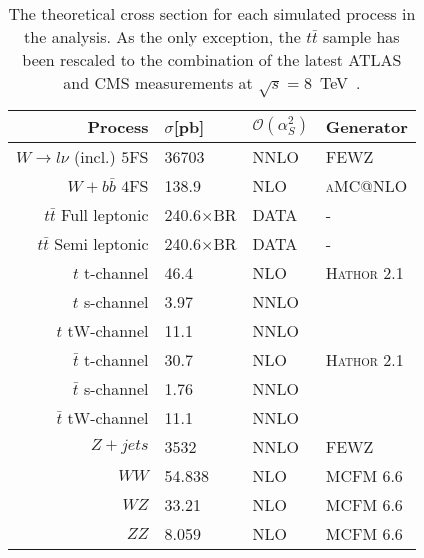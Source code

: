 \begin{table}[htb]
\begin{center}
\begin{tabular}{|r|l|l|l|}
\hline
\textbf{Process}&\textbf{$\sigma$[pb]}& $\mathcal{O}(\alpha_{S}^{2})$& Generator \\ 
\hline
$W \rightarrow l\nu$ (incl.) $5$FS&36703           & NNLO   & \textsc{FEWZ} \\ 
$W+b\bar{b}$ $4$FS   &138.9           & NLO    & \textsc{aMC@NLO} \\
\hline                                         
$t\bar{t}$ Full leptonic &240.6$\times$BR & DATA& \textsc{-}\\
$t\bar{t}$ Semi leptonic &240.6$\times$BR & DATA& \textsc{-}\\
$t$ t-channel        &46.4            & NLO    & \textsc{Hathor 2.1}\\ 
$t$ s-channel        &3.97            & NNLO   & \cite{singletopXsec}\\
$t$ tW-channel       &11.1            & NNLO   & \cite{singletopXsec}\\
$\bar{t}$ t-channel  &30.7            & NLO    & \textsc{Hathor 2.1}\\
$\bar{t}$ s-channel  &1.76            & NNLO   & \cite{singletopXsec}\\
$\bar{t}$ tW-channel &11.1            & NNLO   & \cite{singletopXsec}\\
\hline                                           
$Z + jets  $         &3532            & NNLO   & \textsc{FEWZ}\\
$WW     $            &54.838          & NLO    & \textsc{MCFM 6.6}\\
$WZ     $            &33.21           & NLO    & \textsc{MCFM 6.6}\\
$ZZ     $            &8.059           & NLO    & \textsc{MCFM 6.6}\\
\hline
\end{tabular}
\end{center}
\caption{The theoretical cross section for each simulated 
  process in the analysis. As the only exception, the $t\bar{t}$ sample 
  has been rescaled to the combination of the latest ATLAS and CMS 
  measurements at $\sqrt{s}=8$~TeV~\cite{ttbarxsecATLASCMS}.} 
\label{tab:mcxsecs}
\end{table}


